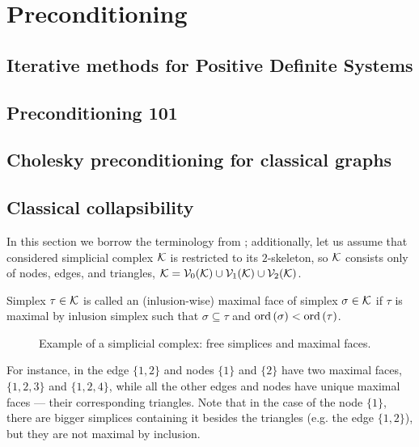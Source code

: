 \chapter{Preconditioning}


\section{ Iterative methods for Positive Definite Systems }




\section{Preconditioning 101}

\section{Cholesky preconditioning for classical graphs}

\section{Classical collapsibility}



In this section we borrow the terminology from \cite{whiteheadSimplicialSpacesNuclei1939}; additionally, let us  assume that considered simplicial complex \( \mathcal{K} \) is restricted to its \(2\)-skeleton, so \( \mathcal{K} \) consists only of nodes, edges, and triangles, \( \mathcal{K} = \mathcal{V}_{0}(\mathcal{K}) \cup \mathcal{V}_{1}(\mathcal{K}) \cup \mathcal{V}_{2}(\mathcal{K})\).

Simplex \( \tau \in \mathcal{K} \) is called an (inlusion-wise) {maximal face} of simplex \( \sigma \in \mathcal{K} \) if \( \tau \) is maximal by inlusion simplex such that \( \sigma \subseteq \tau \) and \( \mathrm{ord}\,(\sigma) < \mathrm{ord}\,(\tau) \). 
\begin{figure}[hbtp]
      \centering
      
      \caption{Example of a simplicial complex: free simplices and maximal faces. \label{fig:adjacent_triangles}}
\end{figure}
 For instance, in  the edge \( \{1, 2\} \) and nodes \( \{ 1 \} \) and \( \{ 2 \} \) have two maximal faces, \( \{ 1, 2, 3 \} \) and \( \{ 1, 2, 4 \} \), while all the other edges and nodes have unique maximal faces --- their corresponding triangles. Note that in the case of the node \( \{ 1 \} \), there are bigger simplices containing it besides the triangles (e.g. the edge \( \{ 1, 2 \} \)), but they are not maximal by inclusion.

